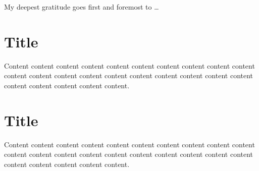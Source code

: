 \documentclass[degree=bachelor,language=english]{thuthesis}
\begin{document}
\begin{acknowledgements}
  My deepest gratitude goes first and foremost to …
\end{acknowledgements}

\statement

\appendix

\chapter{Title}

Content content content content content content content content content content content content content content content content content content content content content content content content content.




\chapter{Title}

Content content content content content content content content content content content content content content content content content content content content content content content content content.



\clearpage
\OMIT
\end{document}
